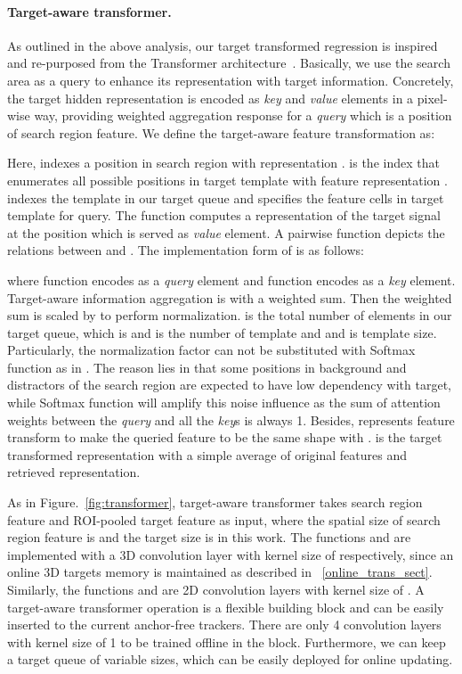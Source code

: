 \documentclass[10pt,twocolumn,letterpaper]{article}
\begin{document}
\paragraph{Target-aware transformer.}
As outlined in the above analysis, our target transformed regression is inspired and re-purposed from the Transformer architecture~\cite{transformer}.
Basically, we use the search area as a query to enhance its representation with target information.
Concretely, the target hidden representation is encoded as \textit{key} and \textit{value} elements in a pixel-wise way, providing weighted aggregation response for a \textit{query} which is a position of search region feature. 
We define the target-aware feature transformation as:

Here,  indexes a position in search region with representation .  is the index that enumerates all possible positions in target template with feature representation .  indexes the template in our target queue and  specifies the feature cells in target template for query. The function  computes
a representation of the target signal at the position  which is served as \textit{value} element. A pairwise function  depicts the relations between  and . The implementation form of  is as follows:

where  function encodes  as a \textit{query} element and  function encodes  as a \textit{key} element. Target-aware information aggregation is with a weighted sum.
Then the weighted sum is scaled by  to perform normalization.  is the total number of elements in our target queue, which is  and  is the number of template and  and  is template size. Particularly, the normalization factor  can not be substituted with Softmax function as in \cite{nonlocal,transformer}. The reason lies in that some positions in background and distractors of the search region are expected to have low dependency with target, while Softmax function will amplify this noise influence as the sum of attention weights between the \textit{query} and all the \textit{key}s is always 1.
Besides,  represents feature transform to make the queried feature to be the same shape with .  is the target transformed representation with a simple average of original features and retrieved representation.


As in Figure.~\ref{fig:transformer}, target-aware transformer takes search region feature and ROI-pooled target feature as input, where the spatial size of search region feature is  and the target size is  in this work. The functions  and  are implemented with a 3D convolution layer with kernel size of  respectively, since an online 3D targets memory is maintained as described in ~\ref{online_trans_sect}. Similarly, the functions  and  are 2D convolution layers with kernel size of .
A target-aware transformer operation is a flexible building block and can be easily inserted to the current anchor-free trackers. There are only 4 convolution layers with kernel size of 1 to be trained offline in the block. Furthermore, we can keep a target queue of variable sizes, which can be easily deployed for online updating.
\end{document}
